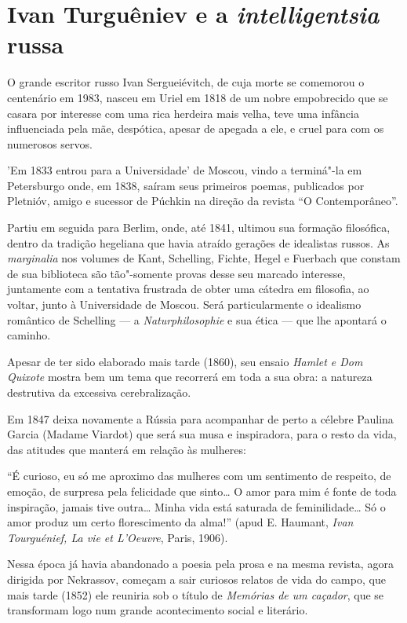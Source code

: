 \chapter{Ivan Turguêniev e a \emph{intelligentsia} russa}


O grande escritor russo Ivan Sergueiévitch, de cuja morte se comemorou o
centenário em 1983, nasceu em Uriel em 1818 de um nobre empobrecido que se casara por interesse com uma rica
herdeira mais velha, teve uma infância influenciada pela mãe, despótica,
apesar de apegada a ele, e cruel para com os numerosos servos.

'Em 1833 entrou para a Universidade' de Moscou, vindo a terminá"-la em
Petersburgo onde, em 1838, saíram seus primeiros poemas, publicados por
Pletnióv, amigo e sucessor de Púchkin na direção da revista ``O
Contemporâneo''.

Partiu em seguida para Berlim, onde, até 1841, ultimou sua formação
filosófica, dentro da tradição hegeliana que havia atraído gerações de
idealistas russos. As \emph{marginalia} nos volumes de Kant, Schelling,
Fichte, Hegel e Fuerbach que constam de sua biblioteca são tão"-somente
provas desse seu marcado interesse, juntamente com a tentativa frustrada
de obter uma cátedra em filosofia, ao voltar, junto à Universidade de
Moscou. Será particularmente o idealismo romântico de Schelling --- a
\emph{Naturphilosophie} e sua ética --- que lhe apontará o caminho.

Apesar de ter sido elaborado mais tarde (1860), seu ensaio \emph{Hamlet e Dom
Quixote} mostra bem um tema que recorrerá em toda a sua obra: a natureza
destrutiva da excessiva cerebralização.

Em 1847 deixa novamente a Rússia para acompanhar de perto a célebre
Paulina Garcia (Madame Viardot) que será sua musa e inspiradora, para o
resto da vida, das atitudes que manterá em relação às mulheres:

``É curioso, eu só me aproximo das mulheres com um sentimento de
respeito, de emoção, de surpresa pela felicidade que sinto\ldots{} O amor para
mim é fonte de toda inspiração, jamais tive outra\ldots{} Minha vida está
saturada de feminilidade\ldots{} Só o amor produz um certo florescimento da
alma!'' (apud E. Haumant, \emph{Ivan Tourguénief, La vie et L'Oeuvre},
Paris, 1906).

Nessa época já havia abandonado a poesia pela prosa e na mesma revista,
agora dirigida por Nekrassov, começam a sair curiosos relatos de vida do
campo, que mais tarde (1852) ele reuniria sob o título de \emph{Memórias
de um caçador}, que se transformam logo num grande acontecimento social
e literário.

